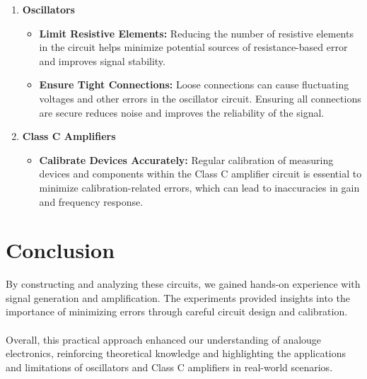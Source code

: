 \documentclass[12pt,a4paper]{report}
\begin{document}
\begin{enumerate}
    \item \textbf{Oscillators}
    \begin{itemize}
        \item \textbf{Limit Resistive Elements:} Reducing the number of resistive elements in the circuit helps minimize potential sources of resistance-based error and improves signal stability.
        \item \textbf{Ensure Tight Connections:} Loose connections can cause fluctuating voltages and other errors in the oscillator circuit. Ensuring all connections are secure reduces noise and improves the reliability of the signal.
    \end{itemize}
    
    \item \textbf{Class C Amplifiers}
    \begin{itemize}
        \item \textbf{Calibrate Devices Accurately:} Regular calibration of measuring devices and components within the Class C amplifier circuit is essential to minimize calibration-related errors, which can lead to inaccuracies in gain and frequency response.
    \end{itemize}
\end{enumerate}
\chapter{Conclusion}
By constructing and analyzing these circuits, we gained hands-on experience with signal generation and amplification. The experiments provided insights into the importance of minimizing errors through careful circuit design and calibration.\\
\\
Overall, this practical approach enhanced our understanding of analouge electronics, reinforcing theoretical knowledge and highlighting the applications and limitations of oscillators and Class C amplifiers in real-world scenarios.

\nocite{*}            %
\end{document}
